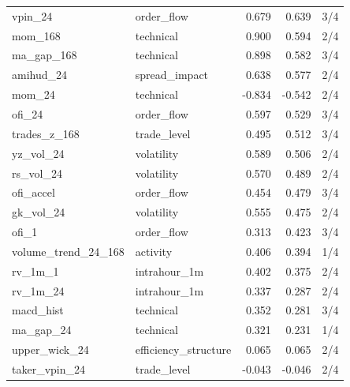 \begin{tabular}{llrrl}
vpin_24 & order_flow & 0.679 & 0.639 & 3/4 \\
mom_168 & technical & 0.900 & 0.594 & 2/4 \\
ma_gap_168 & technical & 0.898 & 0.582 & 3/4 \\
amihud_24 & spread_impact & 0.638 & 0.577 & 2/4 \\
mom_24 & technical & -0.834 & -0.542 & 2/4 \\
ofi_24 & order_flow & 0.597 & 0.529 & 3/4 \\
trades_z_168 & trade_level & 0.495 & 0.512 & 3/4 \\
yz_vol_24 & volatility & 0.589 & 0.506 & 2/4 \\
rs_vol_24 & volatility & 0.570 & 0.489 & 2/4 \\
ofi_accel & order_flow & 0.454 & 0.479 & 3/4 \\
gk_vol_24 & volatility & 0.555 & 0.475 & 2/4 \\
ofi_1 & order_flow & 0.313 & 0.423 & 3/4 \\
volume_trend_24_168 & activity & 0.406 & 0.394 & 1/4 \\
rv_1m_1 & intrahour_1m & 0.402 & 0.375 & 2/4 \\
rv_1m_24 & intrahour_1m & 0.337 & 0.287 & 2/4 \\
macd_hist & technical & 0.352 & 0.281 & 3/4 \\
ma_gap_24 & technical & 0.321 & 0.231 & 1/4 \\
upper_wick_24 & efficiency_structure & 0.065 & 0.065 & 2/4 \\
taker_vpin_24 & trade_level & -0.043 & -0.046 & 2/4 \\
\bottomrule
\end{tabular}
